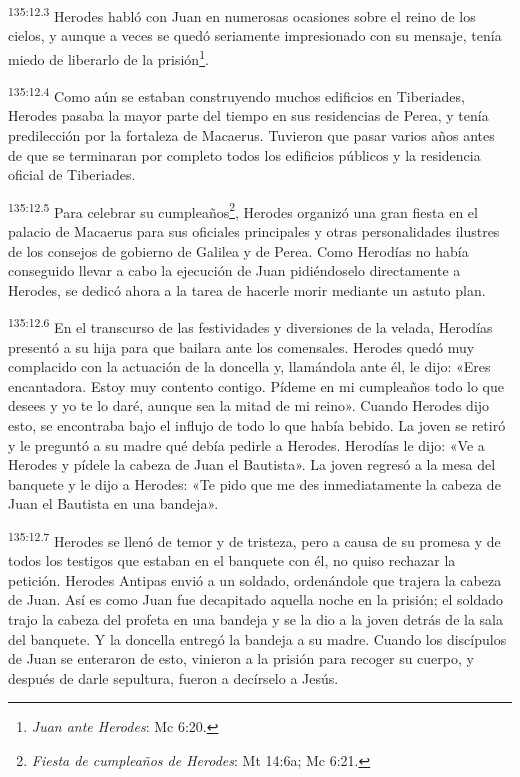 \par 
\textsuperscript{135:12.3} Herodes habló con Juan en numerosas ocasiones sobre el reino de los cielos, y aunque a veces se quedó seriamente impresionado con su mensaje, tenía miedo de liberarlo de la prisión\footnote{\textit{Juan ante Herodes}: Mc 6:20.}.

\par 
\textsuperscript{135:12.4} Como aún se estaban construyendo muchos edificios en Tiberiades, Herodes pasaba la mayor parte del tiempo en sus residencias de Perea, y tenía predilección por la fortaleza de Macaerus. Tuvieron que pasar varios años antes de que se terminaran por completo todos los edificios públicos y la residencia oficial de Tiberiades.

\par 
\textsuperscript{135:12.5} Para celebrar su cumpleaños\footnote{\textit{Fiesta de cumpleaños de Herodes}: Mt 14:6a; Mc 6:21.}, Herodes organizó una gran fiesta en el palacio de Macaerus para sus oficiales principales y otras personalidades ilustres de los consejos de gobierno de Galilea y de Perea. Como Herodías no había conseguido llevar a cabo la ejecución de Juan pidiéndoselo directamente a Herodes, se dedicó ahora a la tarea de hacerle morir mediante un astuto plan.

\par 
\textsuperscript{135:12.6} En el transcurso de las festividades y diversiones de la velada, Herodías presentó a su hija para que bailara ante los comensales. Herodes quedó muy complacido con la actuación de la doncella y, llamándola ante él, le dijo: «Eres encantadora. Estoy muy contento contigo. Pídeme en mi cumpleaños todo lo que desees y yo te lo daré, aunque sea la mitad de mi reino». Cuando Herodes dijo esto, se encontraba bajo el influjo de todo lo que había bebido. La joven se retiró y le preguntó a su madre qué debía pedirle a Herodes. Herodías le dijo: «Ve a Herodes y pídele la cabeza de Juan el Bautista». La joven regresó a la mesa del banquete y le dijo a Herodes: «Te pido que me des inmediatamente la cabeza de Juan el Bautista en una bandeja».

\par 
\textsuperscript{135:12.7} Herodes se llenó de temor y de tristeza, pero a causa de su promesa y de todos los testigos que estaban en el banquete con él, no quiso rechazar la petición. Herodes Antipas envió a un soldado, ordenándole que trajera la cabeza de Juan. Así es como Juan fue decapitado aquella noche en la prisión; el soldado trajo la cabeza del profeta en una bandeja y se la dio a la joven detrás de la sala del banquete. Y la doncella entregó la bandeja a su madre. Cuando los discípulos de Juan se enteraron de esto, vinieron a la prisión para recoger su cuerpo, y después de darle sepultura, fueron a decírselo a Jesús.